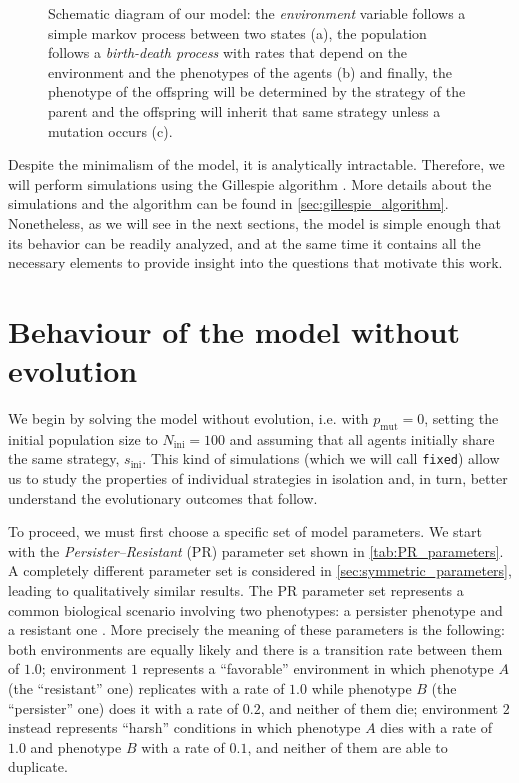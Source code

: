 \documentclass[aps,pre,reprint,10pt,superscriptaddress]{revtex4-2}
\begin{document}
\begin{figure}
{
    }
    \caption{Schematic diagram of our model: the \emph{environment} variable follows a simple markov process between two states (a), the population follows a \emph{birth-death process} with rates that depend on the environment and the phenotypes of the agents (b) and finally, the phenotype of the offspring will be determined by the strategy of the parent and the offspring will inherit that same strategy unless a mutation occurs (c).} \label{fig:model_diagram}
\end{figure}

Despite the minimalism of the model, it is analytically intractable. Therefore, we will perform simulations using the Gillespie algorithm \cite{toralStochasticNumericalMethods}. More details about the simulations and the algorithm can be found in \cref{sec:gillespie_algorithm}. Nonetheless, as we will see in the next sections, the model is simple enough that its behavior can be readily analyzed, and at the same time it contains all the necessary elements to provide insight into the questions that motivate this work.

\section{Behaviour of the model without evolution} \label{sec:no_evolution}

We begin by solving the model without evolution, i.e. with $p_\text{mut}=0$, setting the initial population size to $N_\text{ini}=100$ and assuming that all agents initially share the same strategy, $s_\text{ini}$. This kind of simulations (which we will call \texttt{fixed}) allow us to study the properties of individual strategies in isolation and, in turn, better understand the evolutionary outcomes that follow.

To proceed, we must first choose a specific set of model parameters. We start with the \emph{Persister--Resistant} (PR) parameter set shown in \cref{tab:PR_parameters}. A completely different parameter set is considered in \cref{sec:symmetric_parameters}, leading to qualitatively similar results. The PR parameter set represents a common biological scenario involving two phenotypes: a persister phenotype and a resistant one \cite{patraEmergencePhenotypeSwitching2015,huftonPhenotypicSwitchingPopulations2018}. More precisely the meaning of these parameters is the following: both environments are equally likely and there is a transition rate between them of $1.0$; environment $1$ represents a ``favorable'' environment in which phenotype $A$ (the ``resistant'' one) replicates with a rate of $1.0$ while phenotype $B$ (the ``persister'' one) does it with a rate of $0.2$, and neither of them die; environment $2$ instead represents ``harsh'' conditions in which phenotype $A$ dies with a rate of $1.0$ and phenotype $B$ with a rate of $0.1$, and neither of them are able to duplicate.
\end{document}
